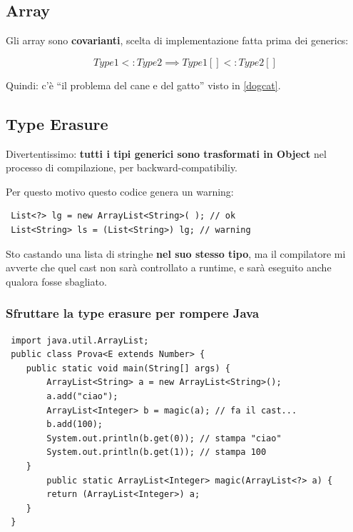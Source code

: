 \documentclass[a4paper,10pt]{article}
\begin{document}
\subsection{Array}
Gli array sono \textbf{covarianti}, scelta di implementazione fatta prima dei generics:

\[ Type1 <: Type2 \implies Type1[] <: Type2[] \]

Quindi: c'è ``il problema del cane e del gatto'' visto in \ref{dogcat}. 


\subsection{Type Erasure}
Divertentissimo: \textbf{tutti i tipi generici sono trasformati in Object} nel processo di compilazione, per backward-compatibiliy.\smallskip

Per questo motivo questo codice genera un warning:
\begin{lstlisting}
 List<?> lg = new ArrayList<String>( ); // ok
 List<String> ls = (List<String>) lg; // warning
\end{lstlisting}

Sto castando una lista di stringhe \textbf{nel suo stesso tipo}, ma il compilatore mi avverte che quel cast non sarà controllato a runtime, e sarà eseguito anche qualora fosse sbagliato.
\subsubsection{Sfruttare la type erasure per rompere Java}

\begin{lstlisting}
 import java.util.ArrayList;
 public class Prova<E extends Number> {
    public static void main(String[] args) {
        ArrayList<String> a = new ArrayList<String>();
        a.add("ciao");
        ArrayList<Integer> b = magic(a); // fa il cast...
        b.add(100);
        System.out.println(b.get(0)); // stampa "ciao"
        System.out.println(b.get(1)); // stampa 100
    }
        public static ArrayList<Integer> magic(ArrayList<?> a) {
        return (ArrayList<Integer>) a;
    }
 }
\end{lstlisting}

\newpage
\end{document}

